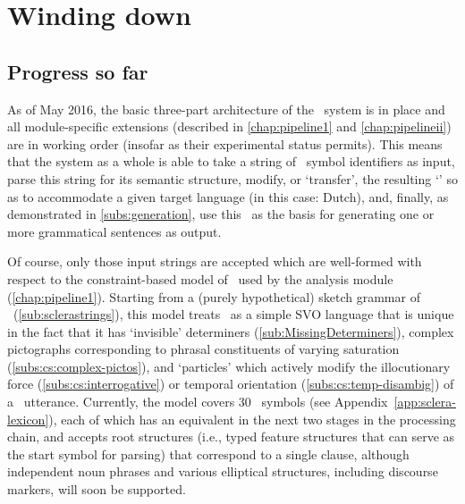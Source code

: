 
\chapter{Winding down}
\label{chap:Conclusion}

\section{Progress so far}
\label{sec:conc:progress}

As of May 2016, the basic three-part architecture of the \depicto\ system is in
place and all module-specific extensions (described in \cref{chap:pipeline1}
and \cref{chap:pipelineii}) are in working order (insofar as their experimental
status permits). This means that the system as a whole is able to take a string
of \sclera\ symbol identifiers as input, parse this string for its semantic
structure, modify, or `transfer', the resulting `\mrs' so as to accommodate a
given target language (in this case: Dutch), and, finally, as demonstrated in
\cref{subs:generation}, use this \mrs\ as the basis for generating one or more
grammatical sentences as output.

Of course, only those input strings are accepted which are well-formed with
respect to the constraint-based model of \sclera\ used by the analysis module
(\cref{chap:pipeline1}). Starting from a (purely hypothetical) sketch grammar
of \sclera\ (\cref{sub:sclerastrings}), this model treats \sclera\ as a simple
SVO language that is unique in the fact that it has `invisible' determiners
(\cref{sub:MissingDeterminers}), complex pictographs corresponding to phrasal
constituents of varying saturation (\cref{subs:cs:complex-pictos}), and
`particles' which actively modify the illocutionary force
(\cref{subs:cs:interrogative}) or temporal orientation
(\cref{subs:cs:temp-disambig}) of a \sclera\ utterance. Currently, the model
covers 30 \sclera\ symbols (see Appendix~\ref{app:sclera-lexicon}), each of
which has an equivalent in the next two stages in the processing chain, and
accepts root structures (i.e., typed feature structures that can serve as the
start symbol for parsing) that correspond to a single clause, although
independent noun phrases and various elliptical structures, including discourse
markers, will soon be supported.

